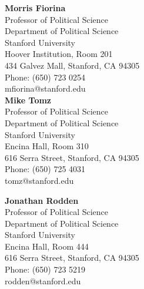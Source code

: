 \documentclass[11pt]{article}
\begin{document}
\begin{minipage}[t]{.21\textwidth}
	\text{ }
\end{minipage}
\begin{minipage}[t]{.37\textwidth}
	\textbf{Morris Fiorina } \\
	Professor of Political Science \\
	Department of Political Science \\
	Stanford University \\
	Hoover Institution, Room 201 \\
	434 Galvez Mall, Stanford, CA 94305 \\
	Phone: (650) 723 0254 \\
	mfiorina@stanford.edu \\

	\textbf{Mike Tomz} \\
	Professor of Political Science \\
	Department of Political Science \\
	Stanford University \\
	Encina Hall, Room 310 \\
	616 Serra Street, Stanford, CA 94305 \\
	Phone: (650) 725 4031 \\
	tomz@stanford.edu \\
\end{minipage}
\begin{minipage}[t]{.37\textwidth}
	\textbf{Jonathan Rodden} \\
	Professor of Political Science \\
	Department of Political Science \\
	Stanford University \\
	Encina Hall, Room 444\\
	616 Serra Street, Stanford, CA 94305\\
	Phone: (650) 723 5219 \\
	rodden@stanford.edu \\
\end{minipage}
\end{document}
